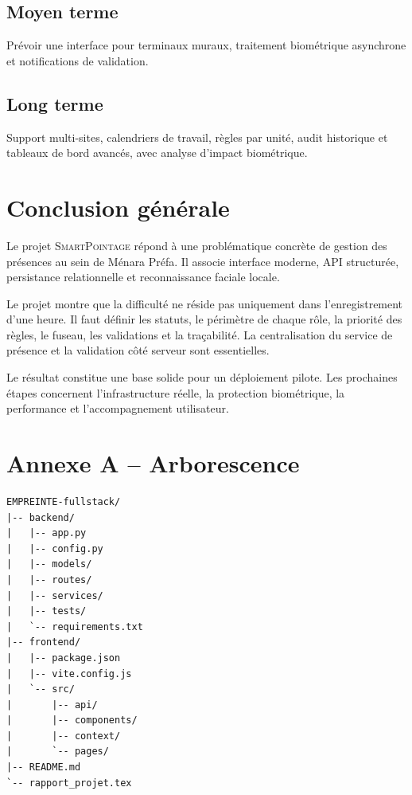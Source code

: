 \documentclass[11pt,a4paper,oneside]{report}
\newcommand{\smartpointage}{\textsc{SmartPointage}}
\newcommand{\menara}{Ménara Préfa}
\begin{document}
\section{Moyen terme}
Prévoir une interface pour terminaux muraux, traitement biométrique asynchrone et notifications de validation.
\section{Long terme}
Support multi-sites, calendriers de travail, règles par unité, audit historique et tableaux de bord avancés, avec analyse d'impact biométrique.

\chapter{Conclusion générale}
Le projet \smartpointage{} répond à une problématique concrète de gestion des présences au sein de \menara{}. Il associe interface moderne, API structurée, persistance relationnelle et reconnaissance faciale locale.

Le projet montre que la difficulté ne réside pas uniquement dans l'enregistrement d'une heure. Il faut définir les statuts, le périmètre de chaque rôle, la priorité des règles, le fuseau, les validations et la traçabilité. La centralisation du service de présence et la validation côté serveur sont essentielles.

Le résultat constitue une base solide pour un déploiement pilote. Les prochaines étapes concernent l'infrastructure réelle, la protection biométrique, la performance et l'accompagnement utilisateur.

\appendix
\chapter{Annexe A -- Arborescence}
\begin{lstlisting}[caption={Arborescence simplifiée}]
EMPREINTE-fullstack/
|-- backend/
|   |-- app.py
|   |-- config.py
|   |-- models/
|   |-- routes/
|   |-- services/
|   |-- tests/
|   `-- requirements.txt
|-- frontend/
|   |-- package.json
|   |-- vite.config.js
|   `-- src/
|       |-- api/
|       |-- components/
|       |-- context/
|       `-- pages/
|-- README.md
`-- rapport_projet.tex
\end{lstlisting}
\end{document}
